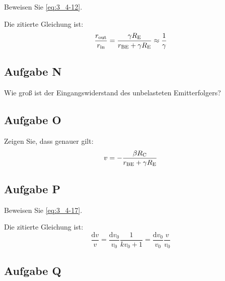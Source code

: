 \begin{problem}
	Beweisen Sie \eqref{eq:3_4-12}.
\end{problem}

Die zitierte Gleichung ist:
\begin{equation}
	\label{eq:3_4-12}
	\frac{r_\text{out}}{r_\text{in}}
	= \frac{\gamma R_\text{E}}{r_\text{BE} + \gamma R_\text{E}}
	\approx \frac 1\gamma
\end{equation}

\fehlt

\FloatBarrier
\subsection{Aufgabe N}

\begin{problem}
	Wie groß ist der Eingangswiderstand des unbelasteten Emitterfolgers?
\end{problem}

\fehlt

\FloatBarrier
\subsection{Aufgabe O}

\begin{problem}
	Zeigen Sie, dass genauer gilt:
	\begin{equation}
		\label{eq:3_4-14}
		v = - \frac{\beta R_\text{C}}{r_\text{BE} + \gamma R_\text{E}}
	\end{equation}
\end{problem}

\fehlt

\FloatBarrier
\subsection{Aufgabe P}

\begin{problem}
	Beweisen Sie \eqref{eq:3_4-17}.
\end{problem}

Die zitierte Gleichung ist:
\begin{equation}
	\label{eq:3_4-17}
	\frac{\mathrm d v} v
	= \frac{\mathrm d v_0}{v_0} \frac{1}{k v_0 + 1}
	= \frac{\mathrm d v_0}{v_0} \frac{v}{v_0}
\end{equation}

\fehlt

\FloatBarrier
\subsection{Aufgabe Q}

